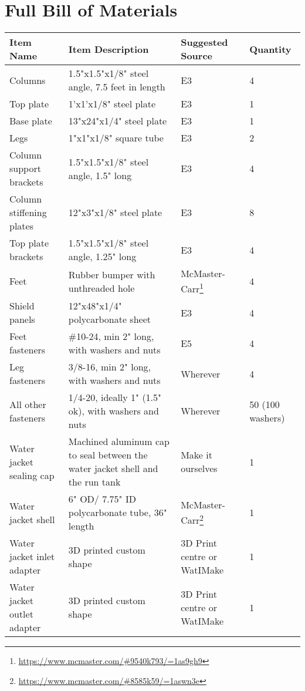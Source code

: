 \documentclass[11pt]{article}
\begin{document}
\section{Full Bill of Materials}
\begin{center}
	\begin{longtabu} to \linewidth { |X[l]|X[2,l]|X[l]|X[0.7,r]| }
		\hline
		\textbf{Item Name} & \textbf{Item Description} & \textbf{Suggested Source} & \textbf{Quantity} \\
		\hline
		Columns & 1.5"x1.5"x1/8" steel angle, 7.5 feet in length & E3 & 4 \\
		\hline
		Top plate & 1'x1'x1/8" steel plate & E3 & 1 \\
		\hline
		Base plate & 13"x24"x1/4" steel plate & E3 & 1 \\
		\hline
		Legs & 1"x1"x1/8" square tube & E3 & 2 \\
		\hline
		Column support brackets & 1.5"x1.5"x1/8" steel angle, 1.5" long & E3 & 4 \\
		\hline
		Column stiffening plates & 12"x3"x1/8" steel plate & E3 & 8 \\
		\hline
		Top plate brackets & 1.5"x1.5"x1/8" steel angle, 1.25" long & E3 & 4 \\
		\hline
		Feet & Rubber bumper with unthreaded hole & McMaster-Carr\footnote{\url{https://www.mcmaster.com/\#9540k793/=1as9gh9}} & 4 \\
		\hline
		Shield panels & 12"x48"x1/4" polycarbonate sheet & E3 & 4\\
		\hline
		Feet fasteners & \#10-24, min 2" long, with washers and nuts	 & E5 & 4 \\
		\hline
		Leg fasteners & 3/8-16, min 2" long, with washers and nuts & Wherever & 4 \\
		\hline
		All other fasteners & 1/4-20, ideally 1" (1.5" ok), with washers and nuts & Wherever & 50 (100 washers) \\
		\hline
		Water jacket sealing cap & Machined aluminum cap to seal between the water jacket shell and the run tank & Make it ourselves & 1 \\
		\hline
		Water jacket shell & 6" OD/ 7.75" ID polycarbonate tube, 36" length & McMaster-Carr\footnote{\url{https://www.mcmaster.com/\#8585k59/=1aswn3e}} & 1 \\
		\hline
		Water jacket inlet adapter & 3D printed custom shape & 3D Print centre or WatIMake & 1 \\
		\hline
		Water jacket outlet adapter & 3D printed custom shape & 3D Print centre or WatIMake & 1 \\

\end{longtabu}
\end{center}
\end{document}
